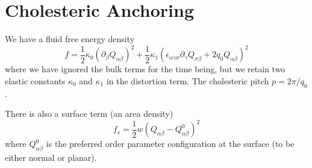 %
%
%
%
%

\section{Cholesteric Anchoring}

We have a fluid free energy density
\begin{equation}
f = 
{\textstyle\frac{1}{2}} \kappa_0 (\partial_\beta Q_{\alpha\beta})^2
+ {\textstyle\frac{1}{2}}
 \kappa_1 (\epsilon_{\alpha\gamma\sigma} \partial_\gamma
Q_{\sigma\beta} + 2q_0 Q_{\alpha\beta})^2
\end{equation}
where we have ignored the bulk terms for the time being, but we retain
two elastic constants $\kappa_0$ and $\kappa_1$ in the distortion term.
The cholesteric pitch $p = 2\pi/q_0$.

There is also a surface term (an area density)
\begin{equation}
f_s = {\textstyle\frac{1}{2}} w (Q_{\alpha\beta} - Q_{\alpha\beta}^0)^2
\end{equation}
where $Q^0_{\alpha\beta}$ is the preferred order parameter configuration
at the surface (to be either normal or planar).

